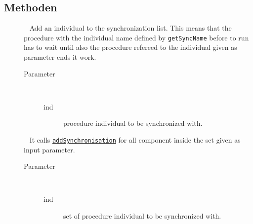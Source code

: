 \subsection{Methoden}
\begin{description}
\item[{\label{ontologyFramework.OFProcedureManagment.OFProcedureSynchronisation.addSynchronisation(org.semanticweb.owlapi.model.OWLNamedIndividual)}}]
~ Add an individual to the synchronization list. This means that the
 procedure with the individual name defined by \texttt{getSyncName}
 before to run has to wait until also the procedure refereed to the individual
 given as parameter ends it work.
\begin{description}
\item[Parameter] ~
\begin{description}
\item[ind]
procedure individual to be synchronized with.
\end{description}
\end{description}
\item[{\label{ontologyFramework.OFProcedureManagment.OFProcedureSynchronisation.addSynchronisation(java.util.Set<org.semanticweb.owlapi.model.OWLNamedIndividual>)}}]
~ It calls \texttt{\hyperlink{ontologyFramework.OFProcedureManagment.OFProcedureSynchronisation.addSynchronisation(org.semanticweb.owlapi.model.OWLNamedIndividual)}{addSynchronisation}} 
 for all component inside the set given as input parameter.
\begin{description}
\item[Parameter] ~
\begin{description}
\item[ind]
set of procedure individual to be synchronized with.
\end{description}
\end{description}
\item[{\label{ontologyFramework.OFProcedureManagment.OFProcedureSynchronisation.getSynchIndividuals()}}]

\end{description}
